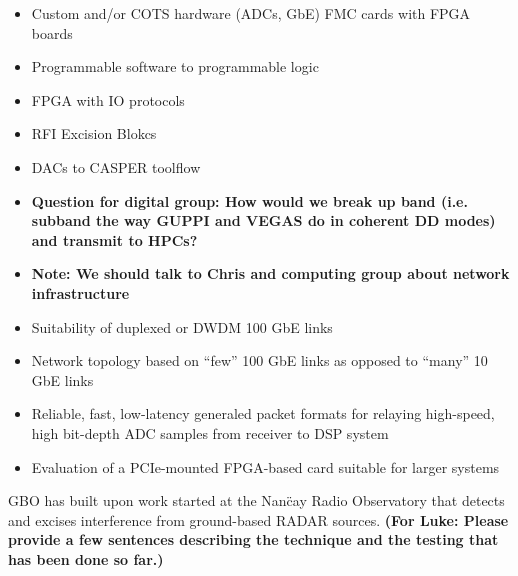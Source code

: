 \documentclass[10pt]{myNSF}
\begin{document}

\begin{itemize}
\item{Custom and/or COTS hardware (ADCs, GbE) FMC cards with FPGA boards}
\item{Programmable software to programmable logic}
\item{FPGA with IO protocols}
\item{RFI Excision Blokcs}
\item{DACs to CASPER toolflow}
\end{itemize}


\begin{itemize}
  \item{\textbf{Question for digital group: How would we break up band
        (i.e. subband the way GUPPI and VEGAS do in coherent DD modes)
        and transmit to HPCs?}}
  \item{\textbf{Note: We should talk to Chris and computing group
        about network infrastructure}}
\item{Suitability of duplexed or DWDM 100 GbE links}
\item{Network topology based on ``few'' 100 GbE links as opposed to
    ``many'' 10 GbE links}
\item{Reliable, fast, low-latency generaled packet formats for
    relaying high-speed, high bit-depth ADC samples from receiver to
    DSP system}
\item{Evaluation of a PCIe-mounted FPGA-based card suitable for larger
    systems}
\end{itemize}



 GBO has built upon work started
at the Nan\"{c}ay Radio Observatory that detects and excises
interference from ground-based RADAR sources.  \textbf{(For Luke:
  Please provide a few sentences describing the technique and the
  testing that has been done so far.)}  
\end{document}
